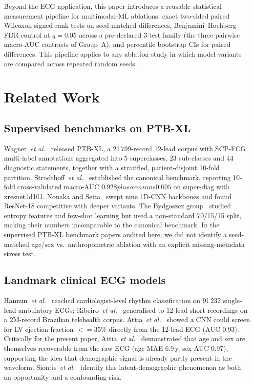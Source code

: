 \documentclass[mathematics,article,submit,pdftex]{Definitions/mdpi}
\def\textbf#1{#1}%
\def\emph#1{#1}%
\def\pm{plus or minus }%
\def\leq{<=}%
\begin{document}
Beyond the ECG application, this paper introduces a reusable statistical measurement pipeline for multimodal-ML ablations: exact two-sided paired Wilcoxon signed-rank tests on seed-matched differences, Benjamini--Hochberg FDR control at $q{=}0.05$ across a \textbf{pre-declared 3-test family} (the three pairwise macro-AUC contrasts of Group~A), and percentile bootstrap CIs for paired differences. This pipeline applies to any ablation study in which model variants are compared across repeated random seeds.

\section{Related Work}\label{sec:relwork}

\subsection{Supervised benchmarks on PTB-XL}
Wagner~\textit{et al.}~\cite{Wagner2020} released PTB-XL, a 21\,799-record 12-lead corpus with SCP-ECG multi-label annotations aggregated into 5 superclasses, 23 sub-classes and 44 diagnostic statements, together with a stratified, patient-disjoint 10-fold partition. Strodthoff~\textit{et al.}~\cite{Strodthoff2021} established the canonical benchmark, reporting 10-fold cross-validated macro-AUC $0.928 \pm 0.005$ on super-diag with xresnet1d101. Nonaka and Seita~\cite{Nonaka2021} swept nine 1D-CNN backbones and found ResNet-18 competitive with deeper variants. The Bydgoszcz group~\cite{Smigiel2021, Palczynski2022} studied entropy features and few-shot learning but used a non-standard 70/15/15 split, making their numbers incomparable to the canonical benchmark. In the supervised PTB-XL benchmark papers audited here, we did not identify a seed-matched age/sex vs.\ anthropometric ablation with an explicit missing-metadata stress test.

\subsection{Landmark clinical ECG models}
Hannun~\textit{et al.}~\cite{Hannun2019} reached cardiologist-level rhythm classification on 91\,232 single-lead ambulatory ECGs; Ribeiro~\textit{et al.}~\cite{Ribeiro2020} generalised to 12-lead short recordings on a 2M-record Brazilian telehealth corpus. Attia~\textit{et al.}~\cite{Attia2019LV} showed a CNN could screen for LV ejection fraction $\leq 35\%$ directly from the 12-lead ECG (AUC 0.93). Critically for the present paper, Attia~\textit{et al.}~\cite{Attia2019AgeSex} demonstrated that age and sex are themselves \emph{recoverable} from the raw ECG (age MAE 6.9\,y, sex AUC 0.97), supporting the idea that demographic signal is already partly present in the waveform. Siontis~\textit{et al.}~\cite{Siontis2021} identify this latent-demographic phenomenon as both an opportunity and a confounding risk.
\end{document}
